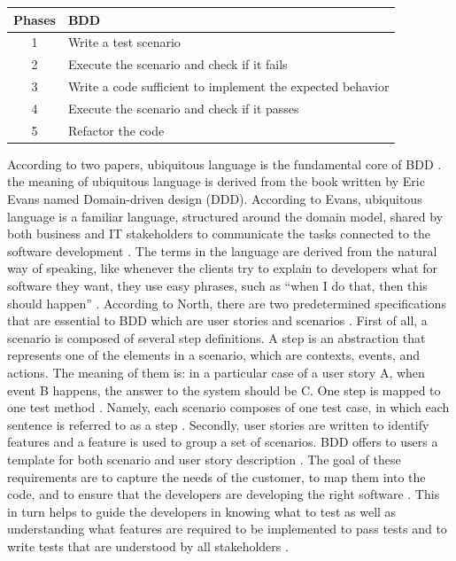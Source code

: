 \documentclass[conference, onecolumn, a4, 12pt]{IEEEtran}
\begin{document}
\begin{tabular}{|c|p{6cm}|}
	\hline 
	Phases & BDD \\ 
	\hline 
	1 & Write a test scenario \\ 
	\hline 
	2 & Execute the scenario and
	check if it fails \\ 
	\hline 
	3 & Write a code sufficient to
	implement the expected
	behavior \\ 
	\hline 
	4 & Execute the scenario and
	check if it passes \\ 
	\hline 
	5 & Refactor the code \\ 
	\hline 
\end{tabular} 

According to two papers, ubiquitous language is the fundamental core of BDD \cite{d4, d5}. the meaning of ubiquitous language is derived from the book written by Eric Evans named Domain-driven design (DDD). According to Evans, ubiquitous language is a familiar
language, structured around the domain model, shared by both business and IT stakeholders to communicate the tasks connected to the software development \cite{d6}. The terms in the
language are derived from the natural way of speaking, like whenever the clients try to explain to developers what for software they want, they use easy phrases, such as “when I do that, then this should happen” \cite{d7}.\newline
According to North, there are two predetermined specifications that are essential to BDD which are user stories and scenarios \cite{d2}. First of all, a scenario is composed of several step definitions. A step is an abstraction that represents one of the elements in a scenario, which are contexts, events, and actions. The meaning of them is: in a particular case of a user story A, when event B happens, the answer to the system should be C. One step is mapped to one test method \cite{d4}. Namely, each scenario composes of one test case, in which each sentence is referred to as a step \cite{d8}. Secondly, user stories are written to identify features and a feature is used to group a set of scenarios. BDD offers to users a template for both scenario and user story description \cite{d1}. The goal of these requirements are to capture the needs of the customer, to map them into the code, and to ensure that the developers are developing the right software \cite{d9}. This in turn helps to guide the developers in knowing what to test as well as understanding what features are required to be implemented to pass tests and to write tests that are understood by all stakeholders \cite{d10}.\newline
\end{document}
